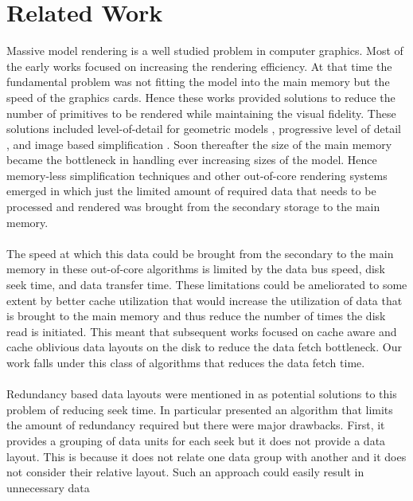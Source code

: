
\section{Related Work}

Massive model rendering is a well studied problem in computer graphics. Most of the early works focused on increasing the rendering efficiency. At that time the fundamental problem was not fitting the model into the main memory but the speed of the graphics cards. Hence these works provided solutions to reduce the number of primitives to be rendered while maintaining the visual fidelity. These solutions included level-of-detail for geometric models \cite{Luebke02}, progressive level of detail \cite{Hoppe:98b,Hoppe:97,Hoppe:96,SG:01}, and image based simplification \cite{ACWBZEHHSBWBM:99}. Soon thereafter the size of the main memory became the bottleneck in handling ever increasing sizes of the model. Hence memory-less simplification techniques \cite{LT:99}  and other out-of-core rendering systems \cite{Silva02,VM:02} emerged in which just the limited amount of required data that needs to be processed and rendered was brought from the secondary storage to the main memory. \\
\\
The speed at which this data
could be brought from the secondary to the main memory in these out-of-core
algorithms is limited by the data bus speed, disk seek time, and data transfer
time. These limitations could be ameliorated to some extent by
better cache utilization that would increase the utilization of data that is
brought to the main memory and thus reduce the number of times the disk read is
initiated. This meant that subsequent works focused on cache aware
\cite{ssdpaper} and cache oblivious data layouts
\cite{cacheobliviouslayout,YOON:2006:MeshLayout} on the disk to reduce the
data fetch bottleneck. Our work falls under this class of algorithms that
reduces the data fetch time. \\
\\
Redundancy based data layouts were mentioned in
\cite{Patterson88,singleseeklayout,optimizingredundancy} as potential solutions
to this problem of reducing seek time. In particular
\cite{optimizingredundancy} presented an algorithm that limits the amount of
redundancy required but there were major drawbacks. First, it provides a
grouping of data units for each seek but it does not provide a data layout.
This is because it does not relate one data group with another and it does not
consider their relative layout. Such an approach could easily result in unnecessary data
